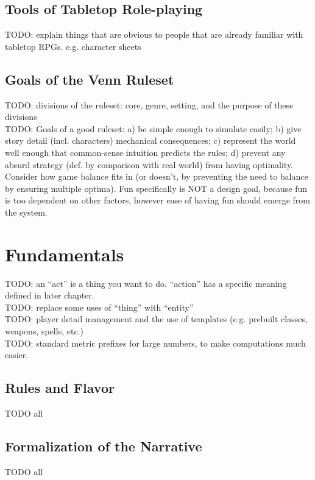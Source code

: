 \documentclass[letterpaper,titlepage,openany,twocolumn]{book}
\begin{document}
\section{Tools of Tabletop Role-playing}
TODO: explain things that are obvious to people that are already familiar with tabletop RPGs. e.g. character sheets\\

\section{Goals of the Venn Ruleset}
TODO: divisions of the ruleset: core, genre, setting, and the purpose of these divisions\\
TODO: Goals of a good ruleset: a) be simple enough to simulate easily; b) give story detail (incl. characters) mechanical consequences; c) represent the world well enough that common-sense intuition predicts the rules; d) prevent any absurd strategy (def. by comparison with real world) from having optimality. Consider how game balance fits in (or doesn’t, by preventing the need to balance by ensuring multiple optima). Fun specifically is NOT a design goal, because fun is too dependent on other factors, however ease of having fun should emerge from the system.\\

\chapter{Fundamentals}
TODO: an “act” is a thing you want to do. “action” has a specific meaning defined in later chapter.\\
TODO: replace some uses of “thing” with “entity”\\
TODO: player detail management and the use of templates (e.g. prebuilt classes, weapons, spells, etc.)\\
TODO: standard metric prefixes for large numbers, to make computations much easier.\\

\section{Rules and Flavor}
TODO all\\

\section{Formalization of the Narrative}
TODO all\\
\end{document}

